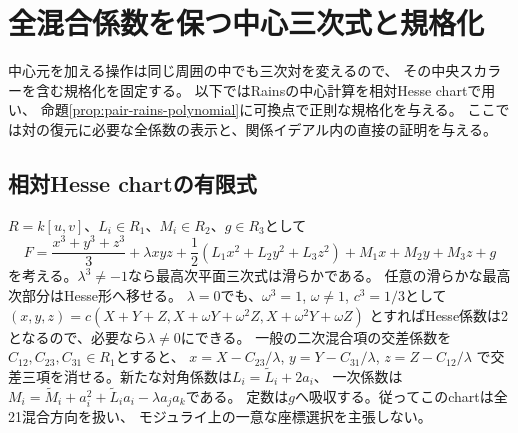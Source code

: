 \section{全混合係数を保つ中心三次式と規格化}
\label{sec:pair-explicit-centers}
中心元を加える操作は同じ周囲の中でも三次対を変えるので、
その中央スカラーを含む規格化を固定する。
以下ではRainsの中心計算\cite[\S9.1]{EG}を相対Hesse chartで用い、
命題\ref{prop:pair-rains-polynomial}に可換点で正則な規格化を与える。
ここでは対の復元に必要な全係数の表示と、関係イデアル内の直接の証明を与える。

\subsection{相対Hesse chartの有限式}
$R=k[u,v]$、$L_i\in R_1$、$M_i\in R_2$、$g\in R_3$として
\[
 F=\frac{x^3+y^3+z^3}{3}+\lambda xyz
   +\frac12(L_1x^2+L_2y^2+L_3z^2)+M_1x+M_2y+M_3z+g
\]
を考える。$\lambda^3\ne-1$なら最高次平面三次式は滑らかである。
任意の滑らかな最高次部分はHesse形へ移せる。
$\lambda=0$でも、$\omega^3=1$, $\omega\ne1$, $c^3=1/3$として
$(x,y,z)=c(X+Y+Z,X+\omega Y+\omega^2Z,X+\omega^2Y+\omega Z)$
とすればHesse係数は2となるので、必要なら$\lambda\ne0$にできる。
一般の二次混合項の交差係数を$C_{12},C_{23},C_{31}\in R_1$とすると、
$x=X-C_{23}/\lambda$, $y=Y-C_{31}/\lambda$, $z=Z-C_{12}/\lambda$
で交差三項を消せる。新たな対角係数は$L_i=\widetilde L_i+2a_i$、
一次係数は$M_i=\widetilde M_i+a_i^2+\widetilde L_i a_i-\lambda a_ja_k$である。
定数は$g$へ吸収する。従ってこのchartは全21混合方向を扱い、
モジュライ上の一意な座標選択を主張しない。

